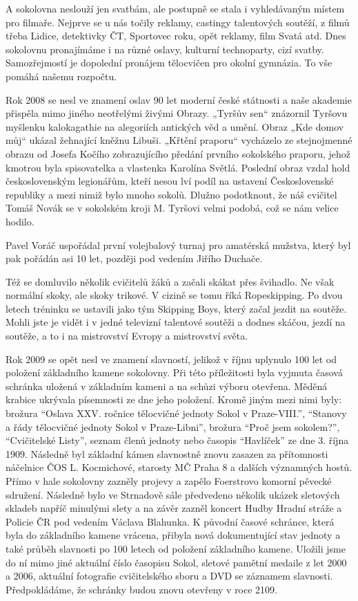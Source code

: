A sokolovna neslouží jen svatbám, ale postupně se stala i vyhledávaným
místem pro filmaře. Nejprve se u nás točily reklamy, castingy
talentových soutěží, z filmů třeba Lidice, detektivky ČT, Sportovec
roku, opět reklamy, film Svatá atd. Dnes sokolovnu pronajímáme i na
různé oslavy, kulturní technoparty, cizí svatby. Samozřejmostí je
dopolední pronájem tělocvičen pro okolní gymnázia. To vše pomáhá našemu
rozpočtu.

Rok 2008 se nesl ve znamení oslav 90 let moderní české státnosti a naše
akademie přispěla mimo jiného neotřelými živými Obrazy. „Tyršův sen``
znázornil Tyršovu myšlenku kalokagathie na alegoriích antických věd a
umění. Obraz „Kde domov můj`` ukázal žehnající kněžnu Libuši. „Křtění
praporu`` vycházelo ze stejnojmenné obrazu od Josefa Kočího
zobrazujícího předání prvního sokolského praporu, jehož kmotrou byla
spisovatelka a vlastenka Karolína Světlá. Poslední obraz vzdal hold
československým legionářům, kteří nesou lví podíl na ustavení
Československé republiky a mezi nimiž bylo mnoho sokolů. Dlužno
podotknout, že náš cvičitel Tomáš Novák se v sokolském kroji M. Tyršovi
velmi podobá, což se nám velice hodilo.

Pavel Voráč uspořádal první volejbalový turnaj pro amatérská mužstva,
který byl pak pořádán asi 10 let, později pod vedením Jiřího Duchače.

Též se domluvilo několik cvičitelů žáků a začali skákat přes švihadlo.
Ne však normální skoky, ale skoky trikové. V cizině se tomu říká
Ropeskipping. Po dvou letech tréninku se ustavili jako tým Skipping
Boys, který začal jezdit na soutěže. Mohli jste je vidět i v jedné
televizní talentové soutěži a dodnes skáčou, jezdí na soutěže, a to i na
mistrovství Evropy a mistrovství světa.

Rok 2009 se opět nesl ve znamení slavností, jelikož v říjnu uplynulo 100
let od položení základního kamene sokolovny. Při této příležitosti byla
vyjmuta časová schránka uložená v základním kameni a na schůzi výboru
otevřena. Měděná krabice ukrývala písemnosti ze dne jeho položení. Kromě
jiným mezi nimi byly: brožura ``Oslava XXV. ročnice tělocvičné jednoty
Sokol v Praze-VIII.'', ``Stanovy a řády tělocvičné jednoty Sokol v
Praze-Libni'', brožura ``Proč jsem sokolem?'', ``Cvičitelské Listy'',
seznam členů jednoty nebo časopis ``Havlíček'' ze dne 3. října 1909.
Následně byl základní kámen slavnostně znovu zasazen za přítomnosti
náčelnice ČOS L. Kocmichové, starosty MČ Praha 8 a dalších významných
hostů. Přímo v hale sokolovny zazněly projevy a zapělo Foerstrovo
komorní pěvecké sdružení. Následně bylo ve Strnadově sále předvedeno
několik ukázek sletových skladeb napříč minulými slety a na závěr zazněl
koncert Hudby Hradní stráže a Policie ČR pod vedením Václava Blahunka. K
původní časové schránce, která byla do základního kamene vrácena,
přibyla nová dokumentující stav jednoty a také průběh slavnosti po 100
letech od položení základního kamene. Uložili jsme do ní mimo jiné
aktuální číslo časopisu Sokol, sletové pamětní medaile z let 2000 a
2006, aktuální fotografie cvičitelského sboru a DVD se záznamem
slavnosti. Předpokládáme, že schránky budou znovu otevřeny v roce 2109.

